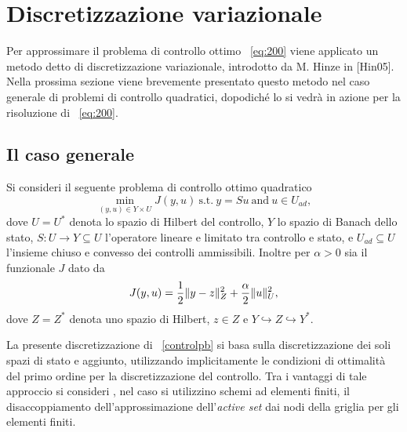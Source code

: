 \section{Discretizzazione variazionale}
\label{chap:DiscVar}
Per approssimare il problema di controllo ottimo ~\eqref{eq:200} viene applicato un metodo detto di discretizzazione variazionale, introdotto da M. Hinze in [Hin05]. Nella prossima sezione viene brevemente presentato questo metodo nel caso generale di problemi di controllo quadratici, dopodiché lo si vedrà in azione per  la risoluzione di ~\eqref{eq:200}.   

\subsection{Il caso generale}

Si consideri il seguente problema di controllo ottimo quadratico
\begin{equation}
\label{controlpb}
\min_{(y,u)\in Y\times U} J(y,u)   \ \text{s.t.} \ y=Su \  \text{and} \ u\in U_{ad},
\end{equation}
dove $ U=U^*$ denota lo spazio di Hilbert del controllo, $ Y $ lo spazio di Banach dello stato, $ S:U\to Y\subseteq U $ l'operatore lineare e limitato tra controllo e stato, e $ U_{ad}\subseteq U $ l'insieme chiuso e convesso dei controlli ammissibili. Inoltre per $ \alpha>0 $ sia il funzionale $ J $ dato da 
\begin{equation}
J(y,u)=\frac{1}{2}\lVert y-z\rVert^2_Z + \frac{\alpha}{2}\lVert u\rVert^2_U,
\end{equation}
dove $ Z=Z^* $ denota uno spazio di Hilbert, $ z\in Z $ e $ Y\hookrightarrow Z\hookrightarrow Y^* $.   

La presente  discretizzazione di ~\eqref{controlpb} si basa sulla discretizzazione dei soli spazi di stato e aggiunto, utilizzando implicitamente le condizioni di ottimalità del primo ordine per la discretizzazione del controllo. Tra i vantaggi di tale approccio si consideri , nel caso si utilizzino schemi ad elementi finiti,  il disaccoppiamento dell'approssimazione dell'\textit{active set} dai nodi della griglia per gli elementi finiti. 

